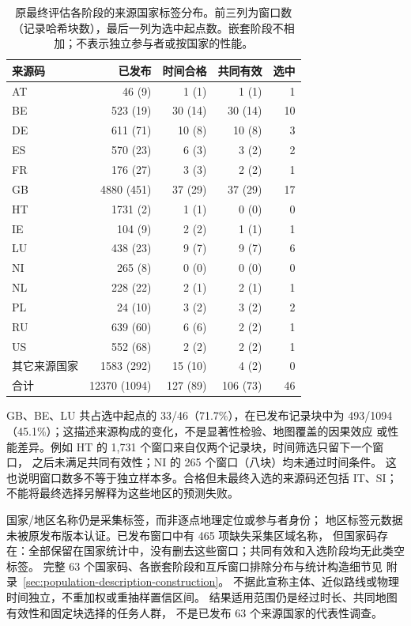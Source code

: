 \documentclass[UTF8,11pt]{ctexart}
\begin{document}
\begin{table}[htbp]
\centering\small
\caption{原最终评估各阶段的来源国家标签分布。前三列为窗口数（记录哈希块数），最后一列为选中起点数。嵌套阶段不相加；不表示独立参与者或按国家的性能。}
\label{tab:final-cohort-geography}
\begin{tabular}{@{}lrrrr@{}}
\toprule
来源码 & 已发布 & 时间合格 & 共同有效 & 选中\\
\midrule
AT & 46 (9) & 1 (1) & 1 (1) & 1\\
BE & 523 (19) & 30 (14) & 30 (14) & 10\\
DE & 611 (71) & 10 (8) & 10 (8) & 3\\
ES & 570 (23) & 6 (3) & 3 (2) & 2\\
FR & 176 (27) & 3 (3) & 2 (2) & 1\\
GB & 4880 (451) & 37 (29) & 37 (29) & 17\\
HT & 1731 (2) & 1 (1) & 0 (0) & 0\\
IE & 104 (9) & 2 (2) & 1 (1) & 1\\
LU & 438 (23) & 9 (7) & 9 (7) & 6\\
NI & 265 (8) & 0 (0) & 0 (0) & 0\\
NL & 228 (22) & 2 (1) & 2 (1) & 1\\
PL & 24 (10) & 3 (2) & 3 (2) & 2\\
RU & 639 (60) & 6 (6) & 2 (2) & 1\\
US & 552 (68) & 2 (2) & 2 (2) & 1\\
其它来源国家 & 1583 (292) & 15 (10) & 4 (2) & 0\\
合计 & 12370 (1094) & 127 (89) & 106 (73) & 46\\
\bottomrule
\end{tabular}
\end{table}

GB、BE、LU 共占选中起点的 33/46（71.7\%），在已发布记录块中为
493/1094（45.1\%）；这描述来源构成的变化，不是显著性检验、地图覆盖的因果效应
或性能差异。例如 HT 的 1,731 个窗口来自仅两个记录块，时间筛选只留下一个窗口，
之后未满足共同有效性；NI 的 265 个窗口（八块）均未通过时间条件。
这也说明窗口数多不等于独立样本多。合格但未最终入选的来源码还包括 IT、SI；
不能将最终选择另解释为这些地区的预测失败。

国家/地区名称仍是采集标签，而非逐点地理定位或参与者身份；
地区标签元数据未被原发布版本认证。已发布窗口中有 465 项缺失采集区域名称，
但国家码存在：全部保留在国家统计中，没有删去这些窗口；共同有效和入选阶段均无此类空标签。
完整 63 个国家码、各嵌套阶段和互斥窗口排除分布与统计构造细节见
附录~\ref{sec:population-description-construction}。
不据此宣称主体、近似路线或物理时间独立，不重加权或重抽样置信区间。
结果适用范围仍是经过时长、共同地图有效性和固定块选择的任务人群，
不是已发布 63 个来源国家的代表性调查。
\end{document}
